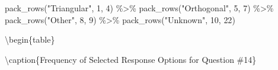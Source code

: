 \documentclass[
  letterpaper,
  DIV=11,
  numbers=noendperiod]{scrreprt}
\newenvironment{Shaded}{\begin{snugshade}}{\end{snugshade}}
\newcommand{\DecValTok}[1]{\textcolor[rgb]{0.68,0.00,0.00}{#1}}
\newcommand{\FunctionTok}[1]{\textcolor[rgb]{0.28,0.35,0.67}{#1}}
\newcommand{\NormalTok}[1]{\textcolor[rgb]{0.00,0.23,0.31}{#1}}
\newcommand{\SpecialCharTok}[1]{\textcolor[rgb]{0.37,0.37,0.37}{#1}}
\newcommand{\StringTok}[1]{\textcolor[rgb]{0.13,0.47,0.30}{#1}}
\begin{document}
\begin{Shaded}
\begin{Highlighting}[]
  \FunctionTok{pack\_rows}\NormalTok{(}\StringTok{"Triangular"}\NormalTok{, }\DecValTok{1}\NormalTok{, }\DecValTok{4}\NormalTok{) }\SpecialCharTok{\%\textgreater{}\%}
  \FunctionTok{pack\_rows}\NormalTok{(}\StringTok{"Orthogonal"}\NormalTok{, }\DecValTok{5}\NormalTok{, }\DecValTok{7}\NormalTok{) }\SpecialCharTok{\%\textgreater{}\%}
  \FunctionTok{pack\_rows}\NormalTok{(}\StringTok{"Other"}\NormalTok{, }\DecValTok{8}\NormalTok{, }\DecValTok{9}\NormalTok{) }\SpecialCharTok{\%\textgreater{}\%}
  \FunctionTok{pack\_rows}\NormalTok{(}\StringTok{"Unknown"}\NormalTok{, }\DecValTok{10}\NormalTok{, }\DecValTok{22}\NormalTok{)}
\end{Highlighting}
\end{Shaded}

\textbackslash begin\{table\}

\textbackslash caption\{\label{tab:Q14-RESPONSES}Frequency of Selected
Response Options for Question \#14\} \centering
\end{document}
